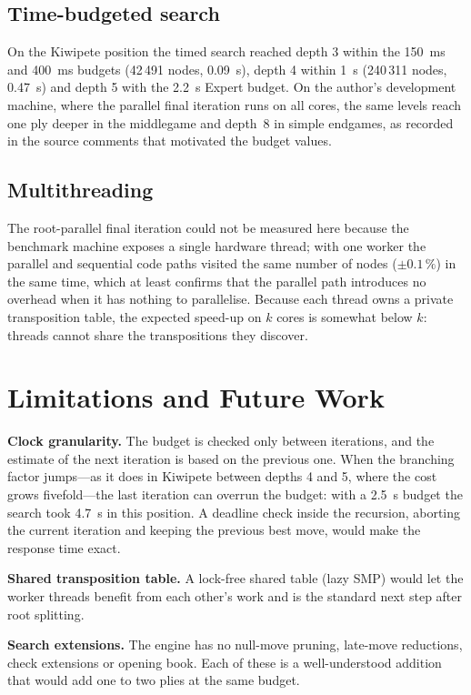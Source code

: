 \documentclass[conference]{IEEEtran}
\begin{document}
\subsection{Time-budgeted search}
On the Kiwipete position the timed search reached depth 3 within the 150~ms and 400~ms budgets (42\,491 nodes, 0.09~s), depth 4 within 1~s (240\,311 nodes, 0.47~s) and depth 5 with the 2.2~s Expert budget. On the author's development machine, where the parallel final iteration runs on all cores, the same levels reach one ply deeper in the middlegame and depth~8 in simple endgames, as recorded in the source comments that motivated the budget values.

\subsection{Multithreading}
The root-parallel final iteration could not be measured here because the benchmark machine exposes a single hardware thread; with one worker the parallel and sequential code paths visited the same number of nodes ($\pm0.1\,\%$) in the same time, which at least confirms that the parallel path introduces no overhead when it has nothing to parallelise. Because each thread owns a private transposition table, the expected speed-up on $k$ cores is somewhat below $k$: threads cannot share the transpositions they discover.

\section{Limitations and Future Work}
\textbf{Clock granularity.} The budget is checked only between iterations, and the estimate of the next iteration is based on the previous one. When the branching factor jumps---as it does in Kiwipete between depths 4 and 5, where the cost grows fivefold---the last iteration can overrun the budget: with a 2.5~s budget the search took 4.7~s in this position. A deadline check inside the recursion, aborting the current iteration and keeping the previous best move, would make the response time exact.

\textbf{Shared transposition table.} A lock-free shared table (lazy SMP) would let the worker threads benefit from each other's work and is the standard next step after root splitting.

\textbf{Search extensions.} The engine has no null-move pruning, late-move reductions, check extensions or opening book. Each of these is a well-understood addition that would add one to two plies at the same budget.
\end{document}
